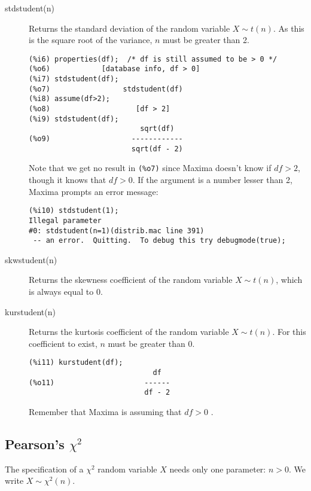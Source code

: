 \documentclass[12pt,a4paper]{article}
\begin{document}
\begin{description}
\item[stdstudent(n)] Returns the standard deviation of the random variable $X \sim t(n)$. As this is the square root of the variance, $n$ must be greater than 2.

\begin{verbatim}
(%i6) properties(df);  /* df is still assumed to be > 0 */
(%o6)            [database info, df > 0]
(%i7) stdstudent(df);
(%o7)                 stdstudent(df)
(%i8) assume(df>2);
(%o8)                    [df > 2]
(%i9) stdstudent(df);
                          sqrt(df)
(%o9)                   ------------
                        sqrt(df - 2)
\end{verbatim}
Note that we get no result in \verb|(%o7)| since Maxima doesn't know if $df>2$, though it knows that $df>0$. If the  argument is a number lesser than 2, Maxima prompts an error message:
\begin{verbatim}
(%i10) stdstudent(1);
Illegal parameter
#0: stdstudent(n=1)(distrib.mac line 391)
 -- an error.  Quitting.  To debug this try debugmode(true);
\end{verbatim}

\item[skwstudent(n)] Returns the skewness coefficient of the random variable $X \sim t(n)$, which is always equal to 0.

\item[kurstudent(n)] Returns the kurtosis coefficient of the random variable $X \sim t(n)$. For this coefficient to exist, $n$ must be greater than 0.

\begin{verbatim}
(%i11) kurstudent(df);
                             df
(%o11)                     ------
                           df - 2
\end{verbatim}
Remember that Maxima is assuming that $df>0$ .

\end{description}


\subsection{Pearson's $\chi^2$}

The specification of a $\chi^2$ random variable $X$ needs only one parameter: $n > 0$. We write $X \sim \chi^2(n)$.
\end{document}
